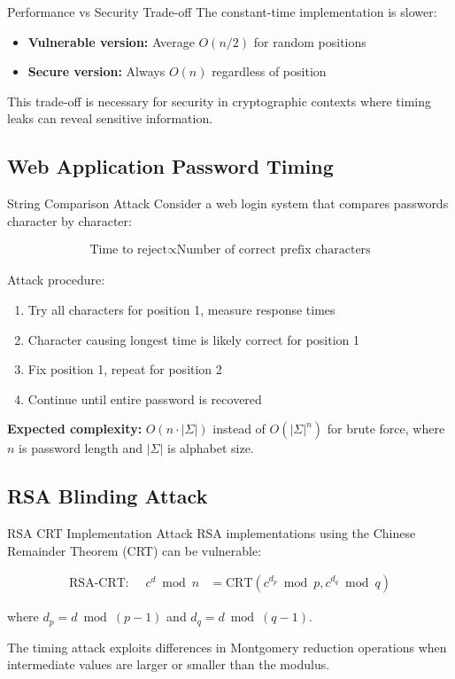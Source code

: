 \documentclass[12pt,a4paper]{article}
\theoremstyle{definition}
\begin{document}
\begin{warningbox}{Performance vs Security Trade-off}
The constant-time implementation is slower:
\begin{itemize}
    \item \textbf{Vulnerable version:} Average $O(n/2)$ for random positions
    \item \textbf{Secure version:} Always $O(n)$ regardless of position
\end{itemize}

This trade-off is necessary for security in cryptographic contexts where timing leaks can reveal sensitive information.
\end{warningbox}

\subsection{Web Application Password Timing}

\begin{examplebox}{String Comparison Attack}
Consider a web login system that compares passwords character by character:

\begin{align}
\text{Time to reject} \propto \text{Number of correct prefix characters}
\end{align}

Attack procedure:
\begin{enumerate}
    \item Try all characters for position 1, measure response times
    \item Character causing longest time is likely correct for position 1
    \item Fix position 1, repeat for position 2
    \item Continue until entire password is recovered
\end{enumerate}

\textbf{Expected complexity:} $O(n \cdot |\Sigma|)$ instead of $O(|\Sigma|^n)$ for brute force, where $n$ is password length and $|\Sigma|$ is alphabet size.
\end{examplebox}

\subsection{RSA Blinding Attack}

\begin{examplebox}{RSA CRT Implementation Attack}
RSA implementations using the Chinese Remainder Theorem (CRT) can be vulnerable:

\begin{align}
\text{RSA-CRT: } \quad c^d \bmod n &= \text{CRT}(c^{d_p} \bmod p, c^{d_q} \bmod q)
\end{align}

where $d_p = d \bmod (p-1)$ and $d_q = d \bmod (q-1)$.

The timing attack exploits differences in Montgomery reduction operations when intermediate values are larger or smaller than the modulus.
\end{examplebox}
\end{document}
